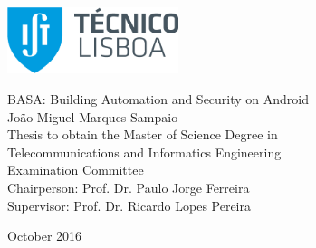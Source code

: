 \thispagestyle {empty}

\includegraphics[width=5.0cm]{Logo.png}

\begin{center}
%
\vspace{0.3cm}
 \vspace{5.0cm}

\vspace{0.8cm}
{\FontLb BASA: Building Automation and Security on Android} \\
\vspace{2.6cm}
{\FontMb João Miguel Marques Sampaio} \\
\vspace{1.9cm}
{\FontLn Thesis to obtain the Master of Science Degree in} \\
\vspace{0.3cm}
{\FontLb Telecommunications and Informatics Engineering} \\
\vspace{1.9cm}
{\FontMb Examination Committee} \\
\vspace{0.3cm}
{\FontSn %
Chairperson:        Prof. Dr. Paulo Jorge Ferreira \\
Supervisor:        Prof. Dr. Ricardo Lopes Pereira \\
}
\vspace{1.5cm}

{\FontMb October 2016} \\
%
\end{center}

\cleardoublepage

\restoregeometry
